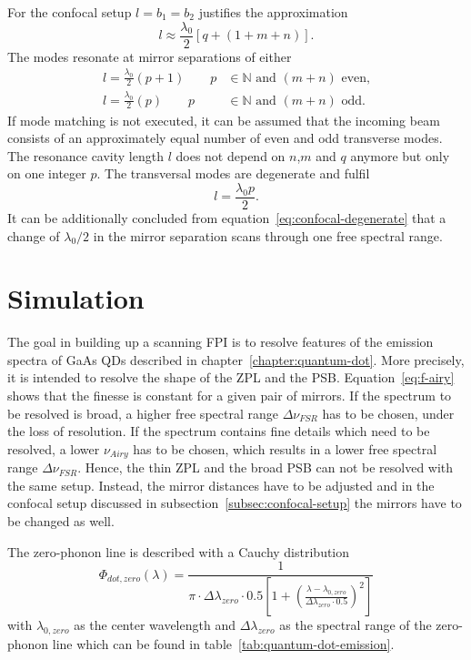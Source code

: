 For the confocal setup $l=b_1=b_2$ justifies the approximation
\begin{equation}
l \approx \frac{\lambda_0}{2} \left[q + \left(1+m+n\right)\right].
\end{equation}
The modes resonate at mirror separations of either
\begin{align}
l = \frac{\lambda_0}{2}(p+1) \qquad p&\in\mathbb{N} \textrm{ and } (m+n) \textrm{ even,} \\
l = \frac{\lambda_0}{2}(p) \qquad p&\in\mathbb{N} \textrm{ and } (m+n) \textrm{ odd.}
\end{align}
If mode matching is not executed, it can be assumed that the incoming beam consists of an approximately equal number of even and odd transverse modes.
The resonance cavity length $l$ does not depend on $n$,$m$ and $q$ anymore but only on one integer $p$. The transversal modes are degenerate and fulfil
\begin{equation}
\label{eq:confocal-degenerate}
l = \frac{\lambda_0 p}{2}.
\end{equation}
It can be additionally concluded from equation~\eqref{eq:confocal-degenerate} that a change of $\lambda_0/2$ in the mirror separation scans through one free spectral range.
\section{Simulation}

The goal in building up a scanning \ac{FPI} is to resolve features of the emission spectra of GaAs \aclp{QD} described in chapter~\ref{chapter:quantum-dot}.
More precisely, it is intended to resolve the shape of the \ac{ZPL} and the \ac{PSB}.
Equation~\ref{eq:f-airy} shows that the finesse is constant for a given pair of mirrors.
If the spectrum to be resolved is broad, a higher free spectral range $\Delta \nu_{FSR}$ has to be chosen, under the loss of resolution.
If the spectrum contains fine details which need to be resolved, a lower $\nu_{Airy}$ has to be chosen, which results in a lower free spectral range $\Delta \nu_{FSR}$.
Hence, the thin \ac{ZPL} and the broad \ac{PSB} can not be resolved with the same setup.
Instead, the mirror distances have to be adjusted and in the confocal setup discussed in subsection~\ref{subsec:confocal-setup} the mirrors have to be changed as well.

The zero-phonon line is described with a Cauchy distribution
\begin{equation}
\Phi_{dot,zero}(\lambda) = \frac{1}{\pi \cdot \Delta\lambda_{zero} \cdot 0.5 \left[1+\left(\frac{\lambda - \lambda_{0, zero}}{\Delta\lambda_{zero} \cdot 0.5}\right)^2\right]}
\end{equation}
with $\lambda_{0, zero}$ as the center wavelength and $\Delta\lambda_{zero}$ as the spectral range of the zero-phonon line which can be found in table~\ref{tab:quantum-dot-emission}.

